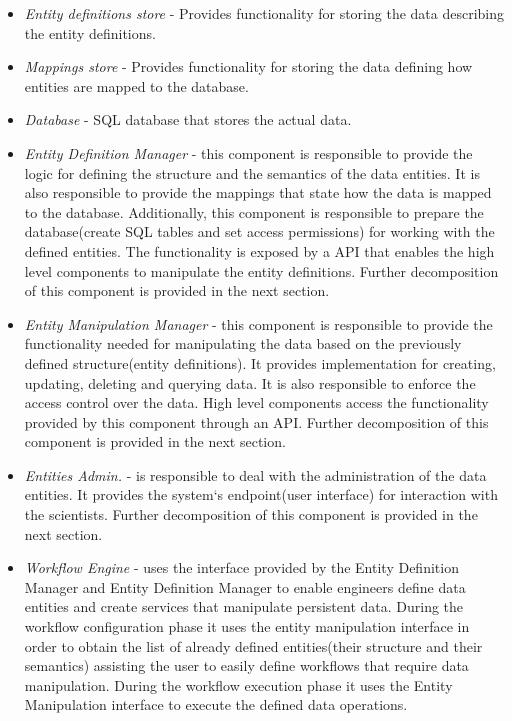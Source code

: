 \begin{itemize}
	
	\item \textit{Entity definitions store} - Provides functionality for storing the data describing the entity definitions. 
		
	\item \textit{Mappings store} - Provides functionality for storing the data defining how entities are mapped to the database.  
	
	\item \textit{Database} - SQL database that stores the actual data.
	
	\item \textit{Entity Definition Manager} - this component is responsible to provide the logic for defining the structure and the semantics of the data entities. It is also responsible to provide the mappings that state how the data is mapped to the database. Additionally, this component is responsible to prepare the database(create SQL tables and set access permissions) for working with the defined entities. The functionality is exposed by a API that enables the high level components to manipulate the entity definitions. Further decomposition of this component is provided in the next section.
		
	\item \textit{Entity Manipulation Manager} - this component is responsible to provide the functionality needed for manipulating the data based on the previously defined structure(entity definitions). It provides implementation for creating, updating, deleting and querying data. It is also responsible to enforce the access control over the data. High level components access the functionality provided by this component through an API. Further decomposition of this component is provided in the next section.
	
	\item \textit{Entities Admin.} - is responsible to deal with the administration of the data entities. It provides the system`s endpoint(user interface) for interaction with the scientists. Further decomposition of this component is provided in the next section.

	\item \textit{Workflow Engine} - uses the interface provided by the Entity Definition Manager and Entity Definition Manager to enable engineers define data entities and create services that manipulate persistent data. During the workflow configuration phase it uses the entity manipulation interface in order to obtain the list of already defined entities(their structure and their semantics) assisting the user to easily define workflows that require data manipulation. During the workflow execution phase it uses the Entity Manipulation interface to execute the defined data operations.
\end{itemize}

